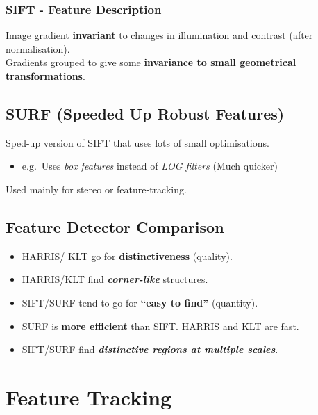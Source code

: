\documentclass[english, 10pt]{article}
\begin{document}
\subsubsection{SIFT - Feature Description}

  Image gradient \textbf{invariant} to changes in illumination and
  contrast (after normalisation). \\

  Gradients grouped to give some \textbf{invariance to
  small geometrical transformations}.


\subsection{SURF (Speeded Up Robust
Features)}\label{surf-speeded-up-robust-features}

  Sped-up version of SIFT that uses lots of small optimisations.

  \begin{itemize}
  \itemsep1pt\parskip0pt
  \item
    e.g.~Uses \emph{box features} instead of \emph{LOG filters} (Much
    quicker)
  \end{itemize}

  Used mainly for stereo or feature-tracking.


\subsection{Feature Detector
Comparison}

\begin{itemize}
\itemsep1pt\parskip0pt
\item
  HARRIS/ KLT go for \textbf{distinctiveness} (quality).
 \item
  HARRIS/KLT find \textbf{\emph{corner-like}} structures.
\item
  SIFT/SURF tend to go for \textbf{``easy to find''} (quantity).
\item
  SURF is \textbf{more efficient }than SIFT.  HARRIS and KLT are
  fast.
\item
  SIFT/SURF find \textbf{\emph{distinctive regions at multiple scales}}.
\end{itemize}

\section{Feature Tracking}

%
\end{document}
